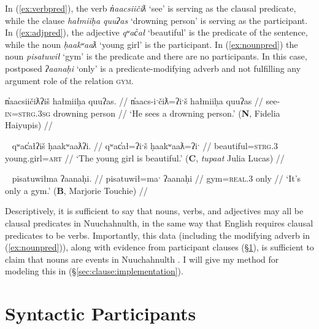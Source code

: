 In (\ref{ex:verbpred}), the verb \textit{n̓aacsiičiƛ} `see' is serving as the clausal predicate, while the clause \textit{hałmiiḥa quuʔas} `drowning person' is serving as the participant. In (\ref{ex:adjpred}), the adjective \textit{qʷac̓ał} `beautiful' is the predicate of the sentence, while the noun \textit{ḥaakʷaaƛ} `young girl' is the participant. In (\ref{ex:nounpred}) the noun \textit{pisatuwił} `gym' is the predicate and there are no participants. In this case, postposed \textit{ʔaanaḥi} `only' is a predicate-modifying adverb and not fulfilling any argument role of the relation \textsc{gym}.

\begin{comment}
While all three words have semantic relations (\textsc{see}, \textsc{drown}, \textsc{person}), only one is the syntactic predicate of the sentence.	
\end{comment}

\ex \label{ex:verbpred}
\begingl
\glpreamble n̓aacsiičiƛʔiš hałmiiḥa quuʔas. //
\gla n̓aacs-iˑčiƛ=ʔiˑš hałmiiḥa quuʔas //
\glb see-\textsc{in}=\textsc{strg.3sg} drowning person //
\glft `He sees a drowning person.' (\textbf{N}, Fidelia Haiyupis) //
\endgl
\xe

\ex~ \label{ex:adjpred}
\begingl
\glpreamble qʷac̓ałʔiš ḥaakʷaaƛʔi. //
\gla qʷac̓ał=ʔiˑš ḥaakʷaaƛ=ʔiˑ //
\glb beautiful=\textsc{strg.3} young.girl=\textsc{art} //
\glft `The young girl is beautiful.' (\textbf{C}, \textit{tupaat} Julia Lucas) //
\endgl
\xe

\ex~ \label{ex:nounpred}
\begingl
\glpreamble pisatuwiłma ʔaanaḥi. //
\gla pisatuwił=maˑ ʔaanaḥi //
\glb gym=\textsc{real.3} only //
\glft `It's only a gym.' (\textbf{B}, Marjorie Touchie) //
\endgl
\xe

Descriptively, it is sufficient to say that nouns, verbs, and adjectives may all be clausal predicates in Nuuchahnulth, in the same way that English requires clausal predicates to be verbs. Importantly, this data (including the modifying adverb in (\ref{ex:nounpred})), along with evidence from participant clauses (\S\ref{sec:clause:partp}), is sufficient to claim that nouns are events in Nuuchahnulth \citep{inman2018}. I will give my method for modeling this in (\S\ref{sec:clause:implementation}).

\section{Syntactic Participants} \label{sec:clause:partp}

